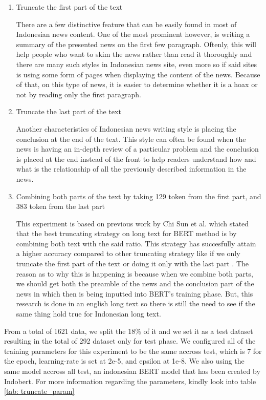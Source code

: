 \begin{enumerate}
  \item Truncate the first part of the text

        There are a few distinctive feature that can be easily found in most of Indonesian news content. One of the most prominent however, is writing a summary of the presented news on the first few paragraph. Oftenly, this will help people who want to skim the news rather than read it thoroughly and there are many such styles in Indonesian news site, even more so if said sites is using some form of pages when displaying the content of the news. Because of that, on this type of news, it is easier to determine whether it is a hoax or not by reading only the first paragraph.

  \item Truncate the last part of the text

        Another characteristics of Indonesian news writing style is placing the conclusion at the end of the text. This style can often be found when the news is having an in-depth review of a particular problem and the conclusion is placed at the end instead of the front to help readers understand how and what is the relationship of all the previously described information in the news.

  \item Combining both parts of the text by taking 129 token from the first part, and 383 token from the last part

        This experiment is based on previous work by Chi Sun et al. which stated that the best truncating strategy on long text for BERT method is by combining both text with the said ratio. This strategy has succesfully attain a higher accuracy compared to other truncating strategy like if we only truncate the first part of the text or doing it only with the last part \cite{sun2019fine}. The reason as to why this is happening is because when we combine both parts, we should get both the preamble of the news and the conclusion part of the news in which then is being inputted into BERT's training phase. But, this research is done in an english long text so there is still the need to see if the same thing hold true for Indonesian long text.

\end{enumerate}

From a total of 1621 data, we split the 18\% of it and we set it as a test dataset resulting in the total of 292 dataset only for test phase. We configured all of the training parameters for this experiment to be the same accross test, which is 7 for the epoch, learning-rate is set at 2e-5, and epsilon at 1e-8. We also using the same model accross all test, an indonesian BERT model that has been created by Indobert. For more information regarding the parameters, kindly look into table \ref{tab: truncate_param}

